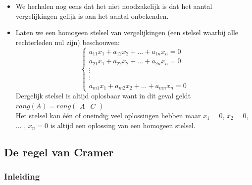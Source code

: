 \begin{itemize}
	\item We herhalen nog eens dat het niet noodzakelijk is dat het aantal vergelijkingen gelijk is aan het aantal onbekenden.
	\item Laten we een homogeen stelsel van vergelijkingen (een stelsel waarbij alle rechterleden nul zijn) beschouwen:
	\[ 
	\left\{ \begin{array}{l}
	a_{11} x_1 + a_{12} x_2 + ... + a_{1n} x_n = 0 \\
	a_{21} x_1 + a_{22} x_2 + ... + a_{2n} x_n = 0 \\
	\vdots \\ \vdots \\
	a_{m1} x_1 + a_{m2} x_2 + ... + a_{mn} x_n = 0
	\end{array}
	\right.
	\]
	Dergelijk stelsel is altijd oplosbaar want in dit geval geldt $rang(A) = rang \left( \begin{array}{c|c} A & C \end{array} \right)$ \\
	Het stelsel kan \'{e}\'{e}n of oneindig veel oplossingen hebben maar $x_1 =0$, $x_2 =0$, $...$ , $x_n =0$ is altijd een oplossing van een homogeen stelsel.
\end{itemize}

\subsection{De regel van Cramer}

\subsubsection{Inleiding}


